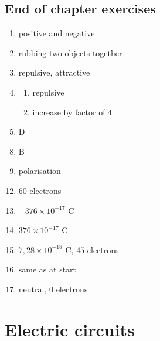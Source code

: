 \subsection{End of chapter exercises}
\begin{multicols}{3}
 \begin{enumerate}[noitemsep, label=\textbf{(\arabic*)} ]
\item positive and negative
\item rubbing two objects together
\item repulsive, attractive
\item 
 \begin{enumerate}[noitemsep, label=\textbf{(\alph*)} ]
\item repulsive
\item increase by factor of 4
 \end{enumerate}
\item D
 \end{enumerate}
\begin{enumerate}[noitemsep, label=\textbf{(\arabic*)} ]
\setcounter{enumi}{7}
 \item B
\item polarisation
\end{enumerate}
\begin{enumerate}[noitemsep, label=\textbf{(\arabic*)} ]
\setcounter{enumi}{11}
 \item $60$ electrons
\item $-376 \times 10^{-17} \text{ C}$
\item $376 \times 10^{-17} \text{ C}$
\item $7,28 \times 10^{-18} \text{ C}$, $45$ electrons
\item same as at start
\item neutral, $0$ electrons
\end{enumerate}
\end{multicols}

\section{Electric circuits}

